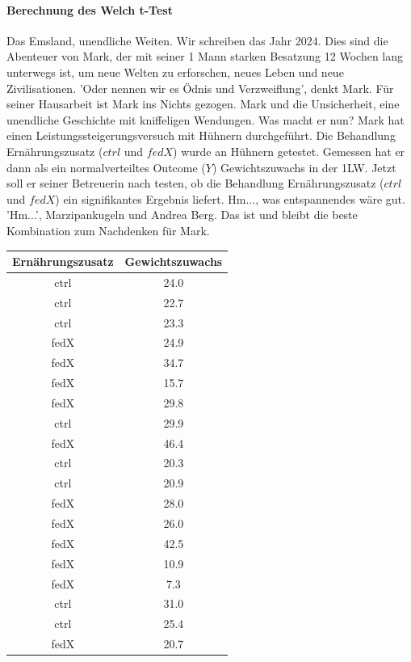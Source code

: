 \documentclass[a4paper, 9pt]{scrartcl}\usepackage[]{graphicx}\usepackage[]{xcolor}
\begin{document}
\paragraph{Berechnung des Welch t-Test}


Das Emsland, unendliche Weiten. Wir schreiben das Jahr 2024. Dies sind die Abenteuer von Mark, der mit seiner 1 Mann starken Besatzung 12 Wochen lang unterwegs ist, um neue Welten zu erforschen, neues Leben und neue Zivilisationen. 'Oder nennen wir es Ödnis und Verzweiflung', denkt Mark. Für seiner Hausarbeit ist Mark ins Nichts gezogen. Mark und die Unsicherheit, eine unendliche Geschichte mit kniffeligen Wendungen. Was macht er nun? Mark hat einen Leistungssteigerungsversuch mit Hühnern durchgeführt. Die Behandlung Ernährungszusatz ($ctrl$ und $fedX$) wurde an Hühnern getestet. Gemessen hat er dann als ein normalverteiltes Outcome ($Y$) Gewichtszuwachs in der 1LW. Jetzt soll er seiner Betreuerin nach testen, ob die Behandlung Ernährungszusatz ($ctrl$ und $fedX$) ein signifikantes Ergebnis liefert. Hm..., was entspannendes wäre gut. 'Hm...', Marzipankugeln und Andrea Berg. Das ist und bleibt die beste Kombination zum Nachdenken für Mark.

\begin{table}[!h]
\centering
\begin{tabular}{cc}
\toprule
Ernährungszusatz & Gewichtszuwachs\\
\midrule
ctrl & 24.0\\
ctrl & 22.7\\
ctrl & 23.3\\
fedX & 24.9\\
fedX & 34.7\\
\addlinespace
fedX & 15.7\\
fedX & 29.8\\
ctrl & 29.9\\
fedX & 46.4\\
ctrl & 20.3\\
\addlinespace
ctrl & 20.9\\
fedX & 28.0\\
fedX & 26.0\\
fedX & 42.5\\
fedX & 10.9\\
\addlinespace
fedX & 7.3\\
ctrl & 31.0\\
ctrl & 25.4\\
fedX & 20.7\\
\bottomrule
\end{tabular}
\end{table}
\end{document}
